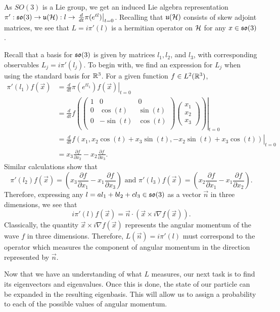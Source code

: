 \documentclass[a4paper]{article}
\begin{document}
As $SO(3)$ is a Lie group, we get an induced Lie algebra representation $\pi' : \mathfrak{so}(3) \to \mathfrak{u}(\mathcal{H}) : l \to \left. \frac{d}{dt}\pi(e^{tl})\right|_{t=0}$. Recalling that $\mathfrak{u}(\mathcal{H})$ consists of skew adjoint matrices, we see that $L = i\pi'(l)$ is a hermitian operator on $\mathcal{H}$ for any $x \in \mathfrak{so}(3)$. 

Recall that a basis for $\mathfrak{so}(3)$ is given by matrices $l_1, l_2$, and $l_3$, with corresponding observables $L_j = i\pi'(l_j)$. To begin with, we find an expression for $L_j$ when using the standard basis for $\mathbb{R}^3$. For a given function $f \in L^2(\mathbb{R}^3)$,
\begin{align*}
    \pi'(l_1)f(\vec{x}) &= \left. \frac{d}{dt} \pi\left(e^{t l_1}\right)f(\vec{x}) \right|_{t=0}\\ 
    &= \left. \frac{d}{dt} f\left(\begin{pmatrix} 1 & 0 & 0 \\ 0 & \cos(t) & \sin(t) \\ 0 & -\sin(t) & \cos(t) \\ \end{pmatrix} \begin{pmatrix}x_1 \\ x_2 \\ x_3 \end{pmatrix}\right) \right|_{t=0}\\
    &= \left. \frac{d}{dt} f(x_1, x_2\cos(t) + x_3 \sin(t), -x_2\sin(t) + x_3 \cos(t)) \right|_{t=0}\\ 
    &= x_3\frac{\partial f}{\partial x_2} - x_2\frac{\partial f}{\partial x_3}.
\end{align*}
Similar calculations show that 
$$\pi'(l_2)f(\vec{x}) = \left(x_3\frac{\partial f}{\partial x_1} - x_1\frac{\partial f}{\partial x_3}\right) \text{  and  } \pi'(l_3)f(\vec{x}) = \left(x_2\frac{\partial f}{\partial x_1} - x_1\frac{\partial f}{\partial x_2}\right).$$
Therefore, expressing any $l = al_1 + bl_2 + cl_3 \in \mathfrak{so}(3)$ as a vector $\vec{n}$ in three dimensions, we see that 
$$i\pi'(l)f(\vec{x}) = \vec{n} \cdot (\vec{x} \times i \nabla f(\vec{x})).$$
Classically, the quantity $
\vec{x} \times i \nabla f(\vec{x})$ represents the angular momentum of the wave $f$ in three dimensions. Therefore, $L(\vec{n}) = i\pi'(l)$ must correspond to the operator which measures the component of angular momentum in the direction represented by $\vec{n}$.

Now that we have an understanding of what $L$ measures, our next task is to find its eigenvectors and eigenvalues. Once this is done, the state of our particle can be expanded in the resulting eigenbasis. This will allow us to assign a probability to each of the possible values of angular momentum. 
\end{document}
